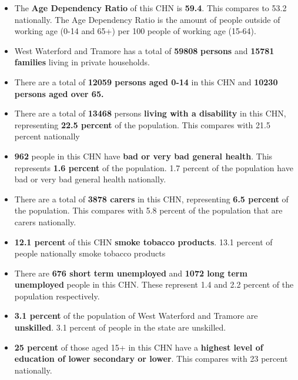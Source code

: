 \documentclass{article}
\begin{document}
\begin{itemize}

\item The \textbf{Age Dependency Ratio} of this CHN is  \textbf{59.4}. This compares to 53.2 nationally. The Age Dependency Ratio is the amount of people outside of working age (0-14 and 65+) per 100 people of working age (15-64). 

\item West Waterford and Tramore has a total of \textbf{\num{59808}} \textbf{persons} and  \textbf{\num{15781}} \textbf{families} living in private households.

\item There are a total of \textbf{\num{12059} persons aged 0-14} in this CHN and \textbf{\num{10230} persons aged over 65.} 

\item There are a total of \textbf{\num{13468}} persons \textbf{living with a disability} in this CHN, representing \textbf{22.5 percent} of the population. This compares with  21.5 percent nationally

\item \textbf{\num{962}} people in this CHN have \textbf{bad or very bad general health}. This represents \textbf{1.6 percent} of the population. 1.7 percent of the population have bad or very bad general health nationally. 

\item There are a total of \textbf{\num{3878} carers} in this CHN, representing \textbf{6.5 percent} of the population. This compares with 5.8 percent of the population that are carers nationally. 

\item \textbf{12.1 percent} of this CHN \textbf{smoke tobacco products}. 13.1 percent of people nationally smoke tobacco products

\item There are \textbf{\num{676} short term unemployed} and \textbf{\num{1072} long term unemployed} people in this CHN. These represent 1.4 and 2.2 percent of the population respectively.

\item  \textbf{3.1 percent} of the population of West Waterford and Tramore are \textbf{unskilled}. 3.1 percent of people in the state are unskilled.

\item \textbf{25 percent} of those aged 15+ in this CHN have a \textbf{highest level of education of lower secondary or lower}. This compares with 23 percent nationally. 


\end{itemize}
\end{document}
